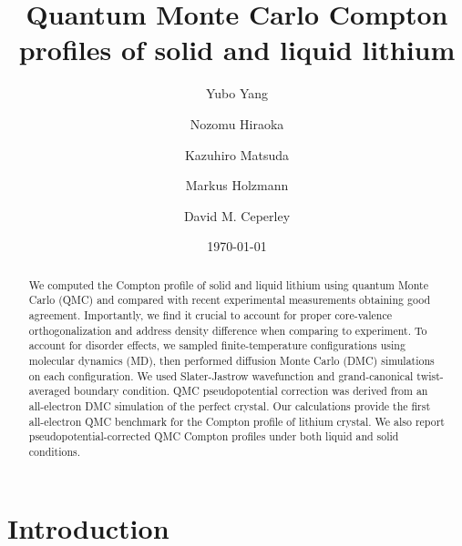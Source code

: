 \documentclass[aps,prb,showpacs,preprintnumbers,amsmath,amssymb,superscriptaddress,twocolumn]{revtex4-1}
\begin{document}
\title{Quantum Monte Carlo Compton profiles of solid and liquid lithium}
\author{Yubo Yang}
\author{Nozomu Hiraoka}
\author{Kazuhiro Matsuda}
\author{Markus Holzmann}
\author{David M. Ceperley}
\date{\today}
\begin{abstract}
We computed the Compton profile of solid and liquid lithium using quantum Monte Carlo (QMC) and compared with recent experimental measurements obtaining good agreement. Importantly, we find it crucial to account for proper core-valence orthogonalization and address density difference when comparing to experiment. To account for disorder effects, we sampled finite-temperature configurations using molecular dynamics (MD), then performed diffusion Monte Carlo (DMC) simulations on each configuration. We used Slater-Jastrow wavefunction and grand-canonical twist-averaged boundary condition. QMC pseudopotential correction was derived from an all-electron DMC simulation of the perfect crystal. Our calculations provide the first all-electron QMC benchmark for the Compton profile of lithium crystal. We also report pseudopotential-corrected QMC Compton profiles under both liquid and solid conditions.
\end{abstract}
\pacs{}
\maketitle

\section{Introduction} \label{sec:intro}
\end{document}

